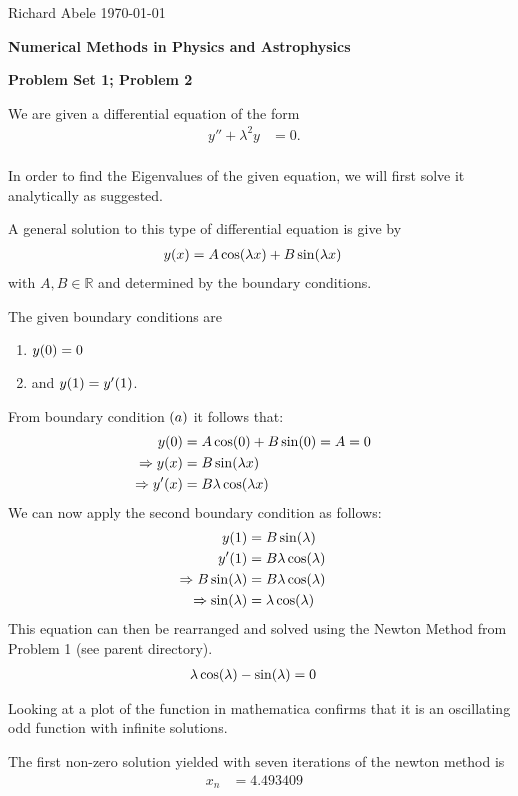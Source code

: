 \documentclass[12pt]{article}
\DeclarePairedDelimiter\rb{(}{)}
\begin{document}
\noindent Richard Abele \hfill \today \\[30pt]
\centerline{ \Large{ \textbf{ Numerical Methods in Physics and Astrophysics }}} 
\centerline{ \Large{ \textbf{ Problem Set 1; Problem 2}}}

We are given a differential equation of the form
\begin{align*}
	y'' + \lambda^{2} y & =  0. &\\
\end{align*}

In order to find the Eigenvalues of the given equation, we will first solve it analytically as suggested. 

A general solution to this type of differential equation is give by 
\begin{align*}
	y\rb*{x} & =  A \cos \rb*{\lambda x} + B \sin \rb*{\lambda x} &\\  
\end{align*}
with \(A,B \in \mathbb{R}\) and determined by the boundary conditions. 

The given boundary conditions are 
\begin{enumerate}[label=(\alph*)]
	\item \(y\rb*{0} = 0\)
	\item and \(y\rb*{1} = y' \rb*{1}\).
\end{enumerate}

From boundary condition \(\rb*{a}\) it follows that:
\begin{align*}
	y \rb*{0} & =  A \cos \rb*{ 0 } + B \sin \rb*{ 0} = A  = 0&\\  
	\Rightarrow y\rb*{x} & =  B \sin \rb*{ \lambda x} &\\ 
	\Rightarrow y' \rb*{x} & =  B \lambda \cos \rb*{ \lambda x} &\\ 
\end{align*}
We can now apply the second boundary condition as follows:
\begin{align*}
	y \rb*{1} & =  B \sin\rb*{\lambda} &\\ 
	y' \rb*{1} & =  B \lambda \cos \rb*{ \lambda} &\\
	\Rightarrow B \sin \rb*{ \lambda} & =  B \lambda \cos \rb*{\lambda} &\\  
	\Rightarrow \sin \rb*{ \lambda} & =  \lambda \cos \rb*{ \lambda} &\\  
\end{align*}
This equation can then be rearranged and solved using the Newton Method from Problem 1 (see parent directory). 
\begin{align*}
	\lambda \cos \rb*{ \lambda} - \sin \rb*{ \lambda} & =  0 &\\  
\end{align*}

Looking at a plot of the function in mathematica confirms that it is an oscillating odd function with infinite solutions. 

The first non-zero solution yielded with seven iterations of the newton method is
\begin{align*}
	x_{n} & =  4.493409 &\\
\end{align*}
\end{document}
